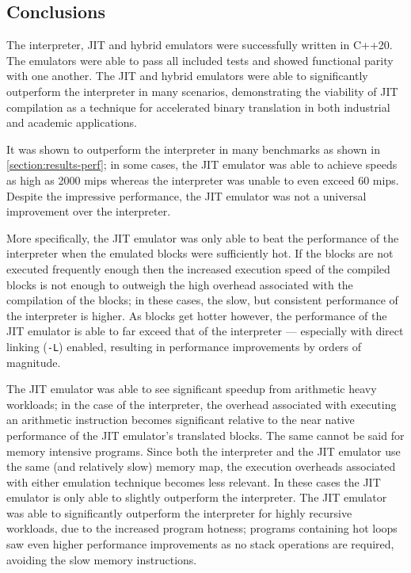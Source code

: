 \subsection{Conclusions}

The interpreter, JIT and hybrid emulators were successfully written in C++20. The emulators were able to pass all included tests and showed functional parity with one another. The JIT and hybrid emulators were able to significantly outperform the interpreter in many scenarios, demonstrating the viability of JIT compilation as a technique for accelerated binary translation in both industrial and academic applications.

It was shown to outperform the interpreter in many benchmarks as shown in \autoref{section:results-perf}; in some cases, the JIT emulator was able to achieve speeds as high as 2000 mips whereas the interpreter was unable to even exceed 60 mips. Despite the impressive performance, the JIT emulator was not a universal improvement over the interpreter.

More specifically, the JIT emulator was only able to beat the performance of the interpreter when the emulated blocks were sufficiently hot. If the blocks are not executed frequently enough then the increased execution speed of the compiled blocks is not enough to outweigh the high overhead associated with the compilation of the blocks; in these cases, the slow, but consistent performance of the interpreter is higher. As blocks get hotter however, the performance of the JIT emulator is able to far exceed that of the interpreter — especially with direct linking (\texttt{-L}) enabled, resulting in performance improvements by orders of magnitude.

The JIT emulator was able to see significant speedup from arithmetic heavy workloads; in the case of the interpreter, the overhead associated with executing an arithmetic instruction becomes significant relative to the near native performance of the JIT emulator's translated blocks. The same cannot be said for memory intensive programs. Since both the interpreter and the JIT emulator use the same (and relatively slow) memory map, the execution overheads associated with either emulation technique becomes less relevant. In these cases the JIT emulator is only able to slightly outperform the interpreter. The JIT emulator was able to significantly outperform the interpreter for highly recursive workloads, due to the increased program hotness; programs containing hot loops saw even higher performance improvements as no stack operations are required, avoiding the slow memory instructions.


